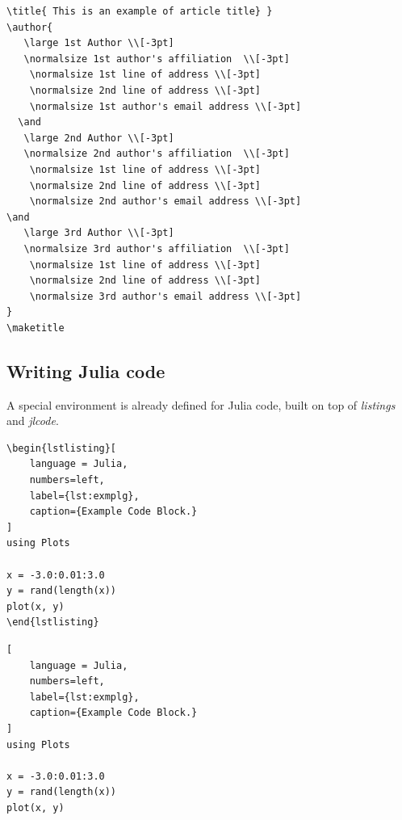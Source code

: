 \documentclass{juliacon}
\begin{document}
\begin{verbatim}
\title{ This is an example of article title} }
\author{
   \large 1st Author \\[-3pt]
   \normalsize 1st author's affiliation  \\[-3pt]
    \normalsize 1st line of address \\[-3pt]
    \normalsize 2nd line of address \\[-3pt]
    \normalsize	1st author's email address \\[-3pt]
  \and
   \large 2nd Author \\[-3pt]
   \normalsize 2nd author's affiliation  \\[-3pt]
    \normalsize 1st line of address \\[-3pt]
    \normalsize 2nd line of address \\[-3pt]
    \normalsize	2nd author's email address \\[-3pt]
\and
   \large 3rd Author \\[-3pt]
   \normalsize 3rd author's affiliation  \\[-3pt]
    \normalsize 1st line of address \\[-3pt]
    \normalsize 2nd line of address \\[-3pt]
    \normalsize	3rd author's email address \\[-3pt]
}
\maketitle
\end{verbatim}

\subsection{Writing Julia code}

A special environment is already defined for Julia code,
built on top of \textit{listings} and \textit{jlcode}.

\begin{verbatim}
\begin{lstlisting}[
    language = Julia, 
    numbers=left, 
    label={lst:exmplg}, 
    caption={Example Code Block.}
]
using Plots

x = -3.0:0.01:3.0
y = rand(length(x))
plot(x, y)
\end{lstlisting}
\end{verbatim}
\begin{lstlisting}[
    language = Julia, 
    numbers=left, 
    label={lst:exmplg}, 
    caption={Example Code Block.}
]
using Plots

x = -3.0:0.01:3.0
y = rand(length(x))
plot(x, y)
\end{lstlisting}
\end{document}
